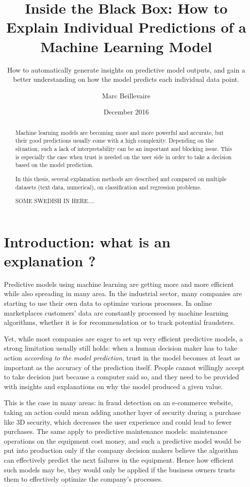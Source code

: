 \documentclass[a4paper,11pt]{kth-mag}
\title{Inside the Black Box: How to Explain Individual Predictions of a Machine Learning Model}
\subtitle{How to automatically generate insights on predictive model outputs, and gain 
	a better understanding on how the model predicts each individual data point.}
\author{Marc Beillevaire}
\date{December 2016}
\begin{document}
\frontmatter
\maketitle


\begin{abstract}
Machine learning models are becoming more and more powerful and accurate, but their good predictions usually come with a high complexity. Depending on the situation, such a lack of interpretability can be an important and blocking issue. This is especially the case when trust is needed on the user side in order to take a decision based on the model prediction.

In this thesis, several explanation methods are described and compared on multiple datasets (text data, numerical), on classification and regression problems.
\end{abstract}

\clearpage
{}
\begin{abstract}
  SOME SWEDISH IN HERE....
\end{abstract}
\clearpage
\tableofcontents
\mainmatter
\chapter{Introduction: what is an explanation ?}

Predictive models using machine learning are getting more and more efficient while also spreading in many area. In the industrial sector, many companies are starting to use their own data to optimize various processes. In online marketplaces customers' data are constantly processed by machine learning algorithms, whether it is for recommendation or to track potential fraudsters.

Yet, while most companies are eager to set up very efficient predictive models, a strong limitation usually still holds: when a human decision maker has to take action \textit{according to the model prediction}, trust in the model becomes at least as important as the accuracy of the prediction itself. People cannot willingly accept to take decision just because a computer said so, and they need to be provided with insights and explanations on why the model produced a given value.

This is the case in many areas: in fraud detection on an e-commerce website,  taking an action could mean adding another layer of security during a purchase like 3D security, which decreases the user experience and could lead to fewer purchases. The same apply to predictive maintenance models: maintenance operations on the equipment cost money, and such a predictive model would be put into production only if the company decision makers believe the algorithm can effectively predict the next failures in the equipment. Hence how efficient such models may be, they would only be applied if the business owners trusts them to effectively optimize the company's processes.
\end{document}
